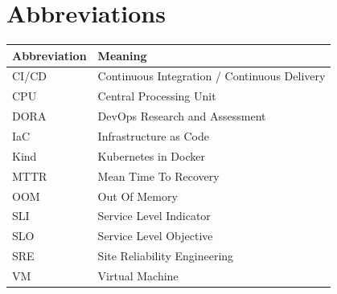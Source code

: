 \chapter*{Abbreviations}

\begin{tabular}{ll}
\toprule
\textbf{Abbreviation} & \textbf{Meaning} \\
\midrule
CI/CD   & Continuous Integration / Continuous Delivery \\
CPU     & Central Processing Unit \\
DORA    & DevOps Research and Assessment \\
IaC     & Infrastructure as Code \\
Kind    & Kubernetes in Docker \\
MTTR    & Mean Time To Recovery \\
OOM     & Out Of Memory \\
SLI     & Service Level Indicator \\
SLO     & Service Level Objective \\
SRE     & Site Reliability Engineering \\
VM      & Virtual Machine \\
\bottomrule
\end{tabular}

\newpage
